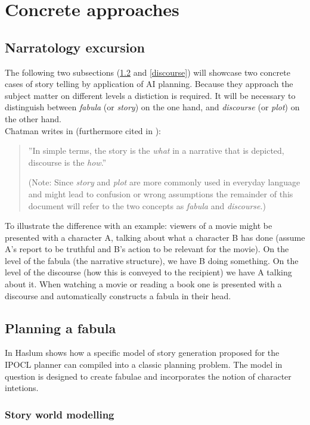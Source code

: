 \section{Concrete approaches}\label{approaches}
\subsection{Narratology excursion}
The following two subsections (\ref{fabula} and \ref{discourse}) will showcase two concrete cases of story telling by application of AI planning. Because they approach the subject matter on different levels a distiction is required. It will be necessary to distinguish between \emph{fabula} (or \emph{story}) on the one hand, and \emph{discourse} (or \emph{plot}) on the other hand.\\
Chatman writes in \cite{Chatman1980} (furthermore cited in \cite{Herman10}):
\begin{quote}
''In simple terms, the story is the \emph{what} in a narrative that is depicted, discourse is the \emph{how}.''

(Note: Since \emph{story} and \emph{plot} are more commonly used in everyday language and might lead to confusion or wrong assumptions the remainder of this document will refer to the two concepts as \emph{fabula} and \emph{discourse}.)
\end{quote}
To illustrate the difference with an example: viewers of a movie might be presented with a character A, talking about what a character B has done (assume A's report to be truthful and B's action to be relevant for the movie). On the level of the fabula (the narrative structure), we have B doing something. On the level of the discourse (how this is conveyed to the recipient) we have A talking about it. When watching a movie or reading a book one is presented with a discourse and automatically constructs a fabula in their head.
\subsection{Planning a fabula}\label{fabula}
In \cite{Haslum14} Haslum shows how a specific model of story generation proposed for the IPOCL planner can compiled into a classic planning problem. The model in question is designed to create fabulae and incorporates the notion of character intetions.
\subsubsection{Story world modelling}

